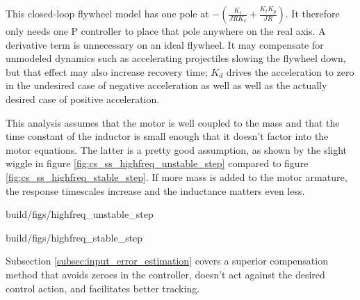 This closed-loop flywheel model has one pole at
$-\left(\frac{K_t}{JRK_v} + \frac{K_t K_p}{JR}\right)$. It therefore only needs
one P controller to place that pole anywhere on the real axis. A derivative
term is unnecessary on an ideal flywheel. It may compensate for unmodeled
dynamics such as accelerating projectiles slowing the flywheel down, but that
effect may also increase recovery time; $K_d$ drives the acceleration to zero in
the undesired case of negative acceleration as well as well as the actually
desired case of positive acceleration.

This analysis assumes that the motor is well coupled to the mass and that the
time constant of the inductor is small enough that it doesn't factor into the
motor equations. The latter is a pretty good assumption, as shown by the slight
wiggle in figure \ref{fig:cs_ss_highfreq_unstable_step} compared to figure
\ref{fig:cs_ss_highfreq_stable_step}. If more mass is added to the motor
armature, the response timescales increase and the inductance matters even less.
\begin{bookfigure}
  \begin{minisvg}{2}{build/figs/highfreq_unstable_step}
    \caption{Step response of second-order DC brushed motor plant augmented with
      position ($L = 230$ μH)}
    \label{fig:cs_ss_highfreq_unstable_step}
  \end{minisvg}
  \hfill
  \begin{minisvg}{2}{build/figs/highfreq_stable_step}
    \caption{Step response of first-order DC brushed motor plant augmented with
      position}
    \label{fig:cs_ss_highfreq_stable_step}
  \end{minisvg}
\end{bookfigure}

Subsection \ref{subsec:input_error_estimation} covers a superior compensation
method that avoids zeroes in the \gls{controller}, doesn't act against the
desired control action, and facilitates better \gls{tracking}.
